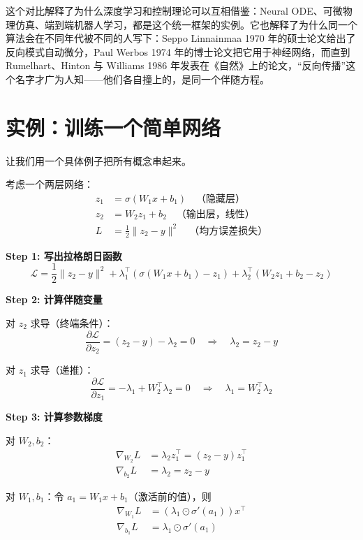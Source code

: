 这个对比解释了为什么深度学习和控制理论可以互相借鉴：Neural ODE、可微物理仿真、端到端机器人学习，都是这个统一框架的实例。它也解释了为什么同一个算法会在不同年代被不同的人写下：Seppo Linnainmaa 1970 年的硕士论文给出了反向模式自动微分，Paul Werbos 1974 年的博士论文把它用于神经网络，而直到 Rumelhart、Hinton 与 Williams 1986 年发表在《自然》上的论文，``反向传播''这个名字才广为人知——他们各自撞上的，是同一个伴随方程。

\section{实例：训练一个简单网络}

让我们用一个具体例子把所有概念串起来。

\begin{example}[两层网络的完整推导]
考虑一个两层网络：
\begin{align}
z_1 &= \sigma(W_1 x + b_1) \quad \text{（隐藏层）} \\
z_2 &= W_2 z_1 + b_2 \quad \text{（输出层，线性）} \\
L &= \frac{1}{2}\|z_2 - y\|^2 \quad \text{（均方误差损失）}
\end{align}

\textbf{Step 1: 写出拉格朗日函数}
\begin{equation}
\mathcal{L} = \frac{1}{2}\|z_2 - y\|^2 + \lambda_1^\top(\sigma(W_1 x + b_1) - z_1) + \lambda_2^\top(W_2 z_1 + b_2 - z_2)
\end{equation}

\textbf{Step 2: 计算伴随变量}

对 $z_2$ 求导（终端条件）：
\begin{equation}
\frac{\partial \mathcal{L}}{\partial z_2} = (z_2 - y) - \lambda_2 = 0 \quad \Rightarrow \quad \lambda_2 = z_2 - y
\end{equation}

对 $z_1$ 求导（递推）：
\begin{equation}
\frac{\partial \mathcal{L}}{\partial z_1} = -\lambda_1 + W_2^\top \lambda_2 = 0 \quad \Rightarrow \quad \lambda_1 = W_2^\top \lambda_2
\end{equation}

\textbf{Step 3: 计算参数梯度}

对 $W_2, b_2$：
\begin{align}
\nabla_{W_2} L &= \lambda_2 z_1^\top = (z_2 - y) z_1^\top \\
\nabla_{b_2} L &= \lambda_2 = z_2 - y
\end{align}

对 $W_1, b_1$：令 $a_1 = W_1 x + b_1$（激活前的值），则
\begin{align}
\nabla_{W_1} L &= (\lambda_1 \odot \sigma'(a_1)) x^\top \\
\nabla_{b_1} L &= \lambda_1 \odot \sigma'(a_1)
\end{align}
\end{example}

